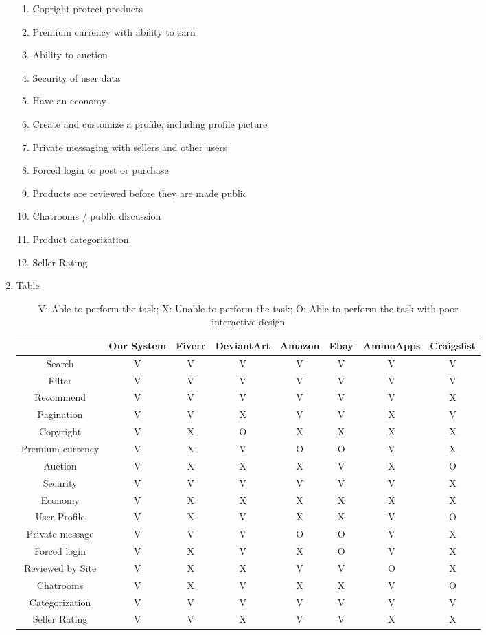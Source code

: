 \documentclass[]{article}
\begin{document}
\begin{enumerate}
\begin{enumerate}
			\item Copright-protect products
			\item Premium currency with ability to earn
			\item Ability to auction
			\item Security of user data
			\item Have an economy
			\item Create and customize a profile, including profile picture
			\item Private messaging with sellers and other users
			\item Forced login to post or purchase
			\item Products are reviewed before they are made public
			\item Chatrooms / public discussion
			\item Product categorization
			\item Seller Rating
		\end{enumerate}
		\item Table
		\begin{table}[!h]
			\begin{tabular}{|c|c|c|c|c|c|c|c|}
				\hline  & Our System & Fiverr & DeviantArt & Amazon & Ebay & AminoApps & Craigslist \\
				\hline Search & V & V & V & V & V & V & V\\
				\hline Filter & V & V & V & V & V & V & V\\
				\hline Recommend & V & V & V & V & V & V & X\\
				\hline Pagination & V & V & X & V & V & X & V\\
				\hline Copyright & V & X & O & X & X & X & X\\
				\hline Premium currency & V & X & V & O & O & V & X\\
				\hline Auction & V & X & X & X & V & X & O\\
				\hline Security & V & V & V & V & V & V & X\\
				\hline Economy & V & X & X & X & X & X & X\\
				\hline User Profile & V & X & V & X & X & V & O\\
				\hline Private message & V & V & V & O & O & V & X\\
				\hline Forced login & V & X & V & X & O & V & X\\
				\hline Reviewed by Site & V & X & X & V & V & O & X\\
				\hline Chatrooms & V & X & V & X & X & V & O\\
				\hline Categorization & V & V & V & V & V & V & V\\
				\hline Seller Rating & V & V & X & V & V & X & X\\ 
				\hline
			\end{tabular}
			\caption{V: Able to perform the task; X: Unable to perform the task; O: Able to perform the task with poor interactive design}
		\end{table}
	\end{enumerate}
\end{document}

